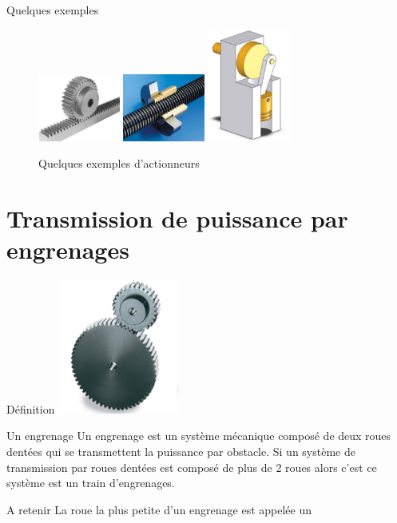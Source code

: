 \documentclass{beamer}
\begin{document}
\begin{frame}{Quelques exemples}
\begin{figure}[h]
          \includegraphics[width=0.24\textwidth]{images/cremaillere}
          \includegraphics[width=0.24\textwidth]{images/vis_ecrou}
          \includegraphics[width=0.24\textwidth]{images/bielle_manivelle}
        \caption{Quelques exemples d'actionneurs}
        \label{fig:exemples}
      \end{figure}
    \end{frame}

\section{Transmission de puissance par engrenages}
\begin{frame}{Définition}
  \centering
  \includegraphics[width=0.3\textwidth]{images/engr_droit}
  \begin{block}{Un engrenage}
    Un engrenage est un système mécanique composé de deux roues dentées qui se transmettent la puissance par obstacle.
    Si un système de transmission par roues dentées est composé de plus de 2 roues alors c’est ce système est un train d’engrenages.
  \end{block}

  \begin{alertblock}{A retenir}
    La roue la plus petite d'un engrenage est appelée un 
  \end{alertblock}
\end{frame}
\end{document}
